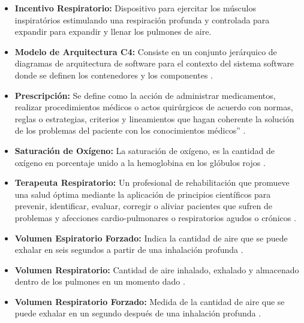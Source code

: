 \documentclass[12pt]{article}
\begin{document}
\begin{itemize}
\item \textbf{Incentivo Respiratorio:} Dispositivo para ejercitar los músculos inspiratórios estimulando una respiración profunda y controlada para expandir para expandir y llenar los pulmones de aire.

\item \textbf{Modelo de Arquitectura C4:} Consiste en un conjunto jerárquico de diagramas de arquitectura de software para el contexto del sistema software donde se definen los contenedores y los componentes \cite{51}.



\item \textbf{Prescripción:} Se define como la acción de administrar medicamentos, realizar procedimientos médicos o actos quirúrgicos de acuerdo con normas, reglas o estrategias, criterios y lineamientos que hagan coherente la solución de los problemas del paciente con los conocimientos médicos” \cite{20}.


\item \textbf{Saturación de Oxígeno:} La saturación de oxígeno, es la cantidad de oxígeno en porcentaje unido a la hemoglobina en los glóbulos rojos \cite{3}.

\item \textbf{Terapeuta Respiratorio:} Un profesional de rehabilitación que promueve una salud óptima mediante la aplicación de principios científicos para prevenir, identificar, evaluar, corregir o aliviar pacientes que sufren de problemas y afecciones cardio-pulmonares o respiratorios agudos o crónicos \cite{4}.

\item \textbf{Volumen Espiratorio Forzado:} Indica la cantidad de aire que se puede exhalar en seis segundos a partir de una inhalación profunda \cite{22}.

\item \textbf{Volumen Respiratorio:} Cantidad de aire inhalado, exhalado y almacenado dentro de los pulmones en un momento dado \cite{2}.

\item \textbf{Volumen Respiratorio Forzado:} Medida de la cantidad de aire que se puede exhalar en un segundo después de una inhalación profunda \cite{22}.











\end{itemize}
\end{document}
